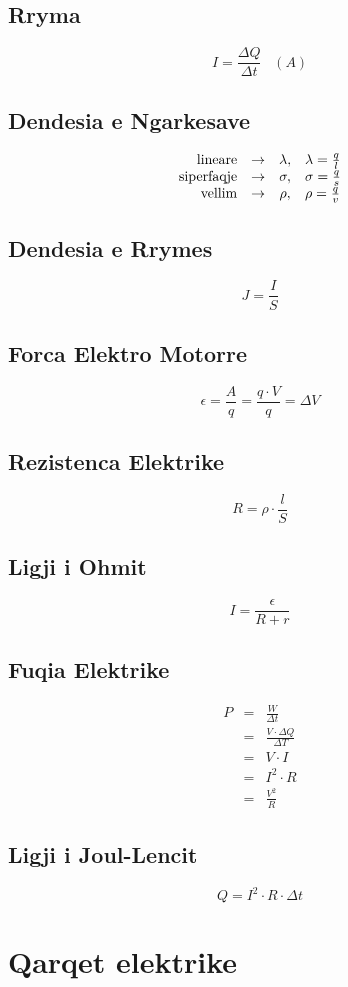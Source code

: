 \documentclass[a4paper, twocolumn]{article}
\begin{document}
\subsection{Rryma}
\[
	I=\frac{\Delta Q}{\Delta t}\;\;\; (A)
\]
\subsection{Dendesia e Ngarkesave}
\[
\begin{array}{r l c l}
	\text{lineare} & \to& \lambda, & \lambda = \frac{q}{l}\\
	\text{siperfaqje} & \to& \sigma, & \sigma = \frac{q}{s}\\
	\text{vellim}& \to& \rho, & \rho = \frac{q}{v}\\
\end{array}
\]
\subsection{Dendesia e Rrymes}
\[
J=\frac{I}{S}
\]
\subsection{Forca Elektro Motorre}
\[
	\epsilon = \frac{A}{q}=\frac{q\cdot V}{q}=\Delta V
\]
\subsection{Rezistenca Elektrike}
\[
R=\rho \cdot \frac{l}{S}
\]
\subsection{Ligji i Ohmit}
\[
	I=\frac{\epsilon}{R+r}
\]
\subsection{Fuqia Elektrike}
\begin{eqnarray*}
	P&=&\frac{W}{\Delta t}\\
	 &=&\frac{V\cdot \Delta Q}{\Delta T}\\
	 &=&V\cdot I\\
	 &=&I^2 \cdot R\\
	 &=& \frac{V^2}{R}
\end{eqnarray*}
\subsection{Ligji i Joul-Lencit}
\[
Q=I^2\cdot R\cdot \Delta t
\]
\section{Qarqet elektrike}
\end{document}
